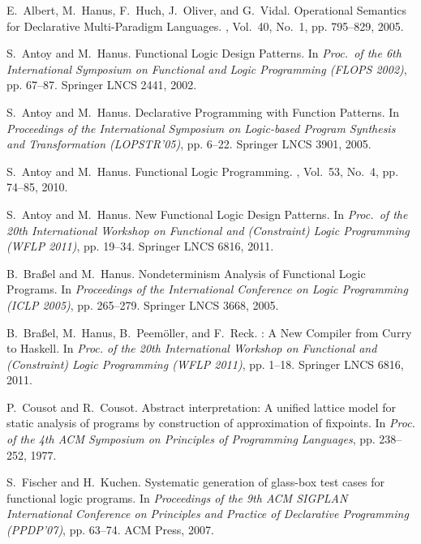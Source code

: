 \documentclass{llncs}
\begin{document}
\begin{thebibliography}{10}

E.~Albert, M.~Hanus, F.~Huch, J.~Oliver, and G.~Vidal.
\newblock Operational Semantics for Declarative Multi-Paradigm Languages.
, Vol.~40, No.~1, pp. 795--829,
  2005.

S.~Antoy and M.~Hanus.
\newblock Functional Logic Design Patterns.
\newblock In {\em Proc.\ of the 6th International Symposium on Functional and
  Logic Programming (FLOPS 2002)}, pp. 67--87. Springer LNCS 2441, 2002.

S.~Antoy and M.~Hanus.
\newblock Declarative Programming with Function Patterns.
\newblock In {\em Proceedings of the International Symposium on Logic-based
  Program Synthesis and Transformation (LOPSTR'05)}, pp. 6--22. Springer LNCS
  3901, 2005.

S.~Antoy and M.~Hanus.
\newblock Functional Logic Programming.
, Vol.~53, No.~4, pp. 74--85, 2010.

S.~Antoy and M.~Hanus.
\newblock New Functional Logic Design Patterns.
\newblock In {\em Proc.\ of the 20th International Workshop on Functional and
  (Constraint) Logic Programming (WFLP 2011)}, pp. 19--34. Springer LNCS 6816,
  2011.

B.~Bra{\ss}el and M.~Hanus.
\newblock Nondeterminism Analysis of Functional Logic Programs.
\newblock In {\em Proceedings of the International Conference on Logic
  Programming (ICLP 2005)}, pp. 265--279. Springer LNCS 3668, 2005.

B.~Bra{\ss}el, M.~Hanus, B.~Peem{\"o}ller, and F.~Reck.
: A New Compiler from {Curry} to {Haskell}.
\newblock In {\em Proc. of the 20th International Workshop on Functional and
  (Constraint) Logic Programming (WFLP 2011)}, pp. 1--18. Springer LNCS 6816,
  2011.

P.~Cousot and R.~Cousot.
\newblock Abstract interpretation: A unified lattice model for static analysis
  of programs by construction of approximation of fixpoints.
\newblock In {\em Proc. of the 4th ACM Symposium on Principles of Programming
  Languages}, pp. 238--252, 1977.

S.~Fischer and H.~Kuchen.
\newblock Systematic generation of glass-box test cases for functional logic
  programs.
\newblock In {\em Proceedings of the 9th ACM SIGPLAN International Conference
  on Principles and Practice of Declarative Programming (PPDP'07)}, pp. 63--74.
  ACM Press, 2007.


\end{thebibliography}
\end{document}
